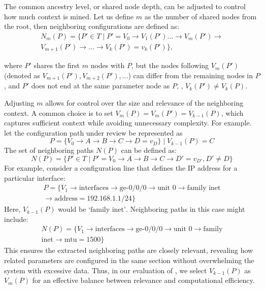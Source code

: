     The common ancestry level, or shared node depth, can be adjusted to control how much context is mined. Let us define \( m \) as the number of shared nodes from the root, then neighboring configurations are defined as:
\begin{multline*}
N_m(P) = \{ P' \in T \mid P' = V_0 \rightarrow  V_1(P')\dots \rightarrow V_m(P') \rightarrow \\ V_{m+1}(P') \rightarrow \dots \rightarrow V_k(P')= v_k(P') \},
\end{multline*}

where \( P' \) shares the first \( m \) nodes with \( P \), but the nodes following \( V_m(P') \) (denoted as \( V_{m+1}(P'), V_{m+2}(P'), \dots \)) can differ from the remaining nodes in \( P \), and 
\(P'\) does not end at the same parameter node as \(P\), \ie, \( V_k(P') \neq V_k(P) \).




Adjusting \( m \) allows for control over the size and relevance of the neighboring context.
A common choice is to set \(V_m(P) = V_m(P') = V_{k-1}(P) \), which captures sufficient context while avoiding unnecessary complexity. For example. let the configuration path under review be represented as
\[
P = \{V_0 \rightarrow A \rightarrow B \rightarrow C \rightarrow D = v_D \} \mid V_{k-1}(P) = C
\]
The set of neighboring paths \( N(P) \) can be defined as:
\[
N(P) = \{ P' \in T \mid P' = V_0 \rightarrow A \rightarrow B \rightarrow C \rightarrow D' = v_{D'}, D' \neq D \}
\]
For example, consider a configuration line that defines the IP address for a particular interface:
\begin{multline*}
P = \{V_1 \rightarrow \text{interfaces} \rightarrow \text{ge-0/0/0} 
\rightarrow \text{unit 0} \rightarrow \text{family inet}\\
\rightarrow \text{address} = 192.168.1.1/24 \}
\end{multline*}
Here, \(V_{k-1}(P)\) would be \( \text{`family inet'} \). Neighboring paths in this case might include:
\begin{multline*}
N(P) = \{V_1 \rightarrow \text{interfaces} \rightarrow \text{ge-0/0/0}
\rightarrow \text{unit 0} \rightarrow
\text{family}\\ \text{inet} \rightarrow \text{mtu} = 1500 \}
\end{multline*}
This ensures the extracted neighboring paths are closely relevant, revealing how related parameters are configured in the same section without overwhelming the system with excessive data. Thus, in our evaluation of \sysname{}, we select \(V_{k-1}(P)\) as  \( V_m(P) \) for an effective balance between relevance and computational efficiency.


